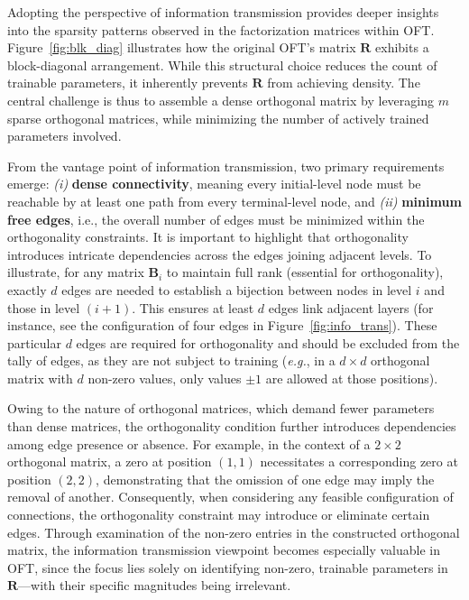 Adopting the perspective of information transmission provides deeper insights into the sparsity patterns observed in the factorization matrices within OFT. Figure~\ref{fig:blk_diag} illustrates how the original OFT’s matrix $\bm{R}$ exhibits a block-diagonal arrangement. While this structural choice reduces the count of trainable parameters, it inherently prevents $\bm{R}$ from achieving density. The central challenge is thus to assemble a dense orthogonal matrix by leveraging $m$ sparse orthogonal matrices, while minimizing the number of actively trained parameters involved.

From the vantage point of information transmission, two primary requirements emerge: \emph{(i)} \textbf{dense connectivity}, meaning every initial-level node must be reachable by at least one path from every terminal-level node, and \emph{(ii)} \textbf{minimum free edges}, i.e., the overall number of edges must be minimized within the orthogonality constraints. It is important to highlight that orthogonality introduces intricate dependencies across the edges joining adjacent levels. To illustrate, for any matrix $\bm{B}_i$ to maintain full rank (essential for orthogonality), exactly $d$ edges are needed to establish a bijection between nodes in level $i$ and those in level $(i+1)$. This ensures at least $d$ edges link adjacent layers (for instance, see the configuration of four edges in Figure~\ref{fig:info_trans}). These particular $d$ edges are required for orthogonality and should be excluded from the tally of edges, as they are not subject to training (\emph{e.g.}, in a $d\times d$ orthogonal matrix with $d$ non-zero values, only values $\pm 1$ are allowed at those positions).

Owing to the nature of orthogonal matrices, which demand fewer parameters than dense matrices, the orthogonality condition further introduces dependencies among edge presence or absence. For example, in the context of a $2\times 2$ orthogonal matrix, a zero at position $(1,1)$ necessitates a corresponding zero at position $(2,2)$, demonstrating that the omission of one edge may imply the removal of another. Consequently, when considering any feasible configuration of connections, the orthogonality constraint may introduce or eliminate certain edges. Through examination of the non-zero entries in the constructed orthogonal matrix, the information transmission viewpoint becomes especially valuable in OFT, since the focus lies solely on identifying non-zero, trainable parameters in $\bm{R}$—with their specific magnitudes being irrelevant.

